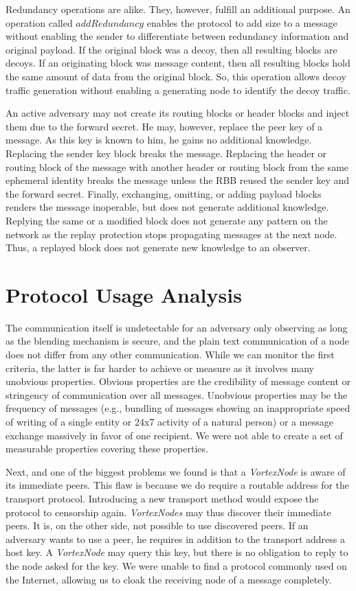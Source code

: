 \documentclass[acmsmall, screen, final]{acmart}
\begin{document}
	Redundancy operations are alike. They, however, fulfill an additional purpose. An operation called $addRedundancy$ enables the protocol to add size to a message without enabling the sender to differentiate between redundancy information and original payload. If the original block was a decoy, then all resulting blocks are decoys. If an originating block was message content, then all resulting blocks hold the same amount of data from the original block. So, this operation allows decoy traffic generation without enabling a generating node to identify the decoy traffic.
	
	An active adversary may not create its routing blocks or header blocks and inject them due to the forward secret. He may, however, replace the peer key of a message. As this key is known to him, he gains no additional knowledge. Replacing the sender key block breaks the message. Replacing the header or routing block of the message with another header or routing block from the same ephemeral identity breaks the message unless the RBB reused the sender key and the forward secret. Finally, exchanging, omitting, or adding payload blocks renders the message inoperable, but does not generate additional knowledge. Replying the same or a modified block does not generate any pattern on the network as the replay protection stops propagating messages at the next node. Thus, a replayed block does not generate new knowledge to an observer.
	
	\section{Protocol Usage Analysis}
	The communication itself is undetectable for an adversary only observing as long as the blending mechanism is secure, and the plain text communication of a node does not differ from any other communication. While we can monitor the first criteria, the latter is far harder to achieve or measure as it involves many unobvious properties. Obvious properties are the credibility of message content or stringency of communication over all messages. Unobvious properties may be the frequency of messages (e.g., bundling of messages showing an inappropriate speed of writing of a single entity or 24x7 activity of a natural person) or a message exchange massively in favor of one recipient. We were not able to create a set of measurable properties covering these properties.
	
	Next, and one of the biggest problems we found is that a \emph{VortexNode} is aware of its immediate peers. This flaw is because we do require a routable address for the transport protocol. Introducing a new transport method would expose the protocol to censorship again. \emph{VortexNodes} may thus discover their immediate peers. It is, on the other side, not possible to use discovered peers. If an adversary wants to use a peer, he requires in addition to the transport address a host key. A \emph{VortexNode} may query this key, but there is no obligation to reply to the node asked for the key. We were unable to find a protocol commonly used on the Internet, allowing us to cloak the receiving node of a message completely.
	
\end{document}
